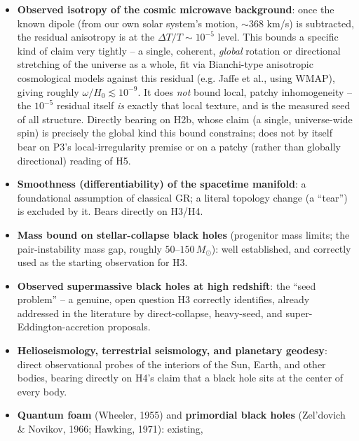 \documentclass[12pt, a4paper]{article}
\begin{document}
\begin{itemize}
    the accelerating expansion inferred from Type Ia supernovae,
    Riess et al. 1998, Perlmutter et al. 1999): real, but measured to
    be extremely small and essentially uniform on the relevant scales
    -- not currently known to be locally concentrated around
    individual masses the way H2a would need.
  \item \textbf{Observed isotropy of the cosmic microwave background}:
    once the known dipole (from our own solar system's motion,
    $\sim$368 km/s) is subtracted, the residual anisotropy is at the
    $\Delta T/T\sim10^{-5}$ level. This bounds a specific kind of
    claim very tightly -- a single, coherent, \emph{global} rotation
    or directional stretching of the universe as a whole, fit via
    Bianchi-type anisotropic cosmological models against this
    residual (e.g. Jaffe et al., using WMAP), giving roughly
    $\omega/H_0\lesssim10^{-9}$. It does \emph{not} bound local,
    patchy inhomogeneity -- the $10^{-5}$ residual itself \emph{is}
    exactly that local texture, and is the measured seed of all
    structure. Directly bearing on H2b, whose claim (a single,
    universe-wide spin) is precisely the global kind this bound
    constrains; does not by itself bear on P3's local-irregularity
    premise or on a patchy (rather than globally directional) reading
    of H5.
  \item \textbf{Smoothness (differentiability) of the spacetime
    manifold}: a foundational assumption of classical GR; a literal
    topology change (a ``tear'') is excluded by it. Bears directly on
    H3/H4.
  \item \textbf{Mass bound on stellar-collapse black holes}
    (progenitor mass limits; the pair-instability mass gap, roughly
    $50$--$150\,M_\odot$): well established, and correctly used as the
    starting observation for H3.
  \item \textbf{Observed supermassive black holes at high redshift}:
    the ``seed problem'' -- a genuine, open question H3 correctly
    identifies, already addressed in the literature by direct-collapse,
    heavy-seed, and super-Eddington-accretion proposals.
  \item \textbf{Helioseismology, terrestrial seismology, and
    planetary geodesy}: direct observational probes of the interiors
    of the Sun, Earth, and other bodies, bearing directly on H4's
    claim that a black hole sits at the center of every body.
  \item \textbf{Quantum foam} (Wheeler, 1955) and \textbf{primordial
    black holes} (Zel'dovich \& Novikov, 1966; Hawking, 1971): existing,

\end{itemize}
\end{document}
